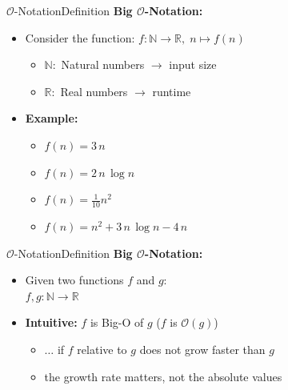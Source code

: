 \begin{frame}{$\mathcal{O}$-Notation}{Definition}
  \textbf{Big $\mathcal{O}$-Notation:}
  \begin{itemize}
    \item<2- |handout:1>
     Consider the function:
      $f\!: \mathbb{N} \to \mathbb{R}, \; n \mapsto f(n)$
      \begin{itemize}
        \item
          $\mathbb{N}\!:$ Natural numbers $\rightarrow$ input size
        \item
          $\mathbb{R}\!:$ Real numbers $\rightarrow$ runtime
      \end{itemize}
   \item<3- |handout:1>
     \textbf{Example:}
     \begin{itemize}[<+- |handout:1>]
       \item
         $f(n) = 3 \, n$
       \item
         $f(n) = 2 \, n \, \log n$
       \item
         $f(n) = \frac{1}{10} n^2$
       \item
         $f(n) = n^2 + 3 \, n \, \log n - 4 \, n$
      \end{itemize}
  \end{itemize}
\end{frame}


\begin{frame}{$\mathcal{O}$-Notation}{Definition}
  \textbf{Big $\mathcal{O}$-Notation:}
  \begin{itemize}
    \item<2- |handout:1>
      Given two functions $f$ and $g$:\\
      $f,g\!: \mathbb{N} \to \mathbb{R}$
    \item<3- |handout:1>
      \textbf{Intuitive:} $f$ is Big-O of $g$ ($f$ is $\mathcal{O}(g)$)
      \begin{itemize}
        \item
          $\ldots$ if $f$ relative to $g$ does not grow faster than $g$
        \item
          the growth rate matters, not the absolute values
      \end{itemize}
  \end{itemize}
\end{frame}


